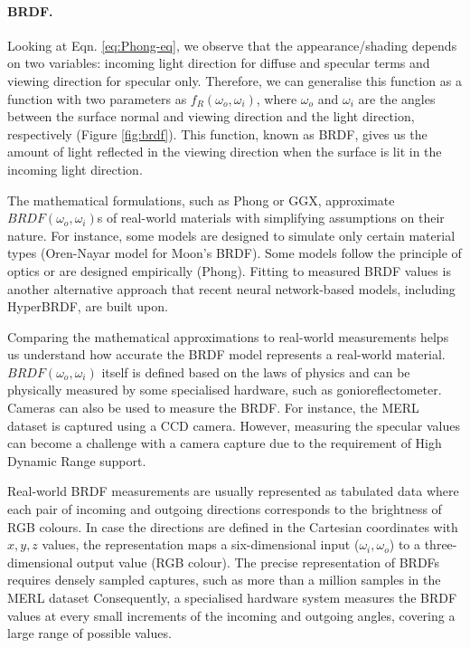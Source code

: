 \paragraph{BRDF.} 
Looking at Eqn. \ref{eq:Phong-eq}, we observe that the appearance/shading depends on two variables: incoming light direction for diffuse and specular terms and viewing direction for specular only. Therefore, we can generalise this function as a function with two parameters as  $f_R(\omega_o, \omega_i)$, where  $\omega_o$ and $\omega_i$ are the angles between the surface normal and viewing direction and the light direction, respectively (Figure \ref{fig:brdf}). This function, known as BRDF, gives us the amount of light reflected in the viewing direction when the surface is lit in the incoming light direction.

The mathematical formulations, such as Phong or GGX, approximate $BRDF(\omega_o, \omega_i)$s of real-world materials with simplifying assumptions on their nature. For instance, some models are designed to simulate only certain material types (Oren-Nayar model for Moon's BRDF). Some models follow the principle of optics or are designed empirically (Phong). Fitting to measured BRDF values is another alternative approach that recent neural network-based models, including HyperBRDF, are built upon.  

Comparing the mathematical approximations to real-world measurements helps us understand how accurate the BRDF model represents a real-world material. $BRDF(\omega_o, \omega_i)$ itself is defined based on the laws of physics and can be physically measured by some specialised hardware, such as gonioreflectometer. Cameras can also be used to measure the BRDF. For instance, the MERL dataset \cite{Matusik2003jul} is captured using a CCD camera. However, measuring the specular values can become a challenge with a camera capture due to the requirement of High Dynamic Range support. 


Real-world BRDF measurements are usually represented as tabulated data where each pair of incoming and outgoing directions corresponds to the brightness of RGB colours. In case the directions are defined in the Cartesian coordinates with $x, y, z$ values, the representation maps a six-dimensional input ($\omega_i, \omega_o$) to a three-dimensional output value (RGB colour). The precise representation of BRDFs requires densely sampled captures, such as more than a million samples in the MERL dataset \cite{Matusik2003jul} Consequently, a specialised hardware system measures the BRDF values at every small increments of the incoming and outgoing angles, covering a large range of possible values. 

